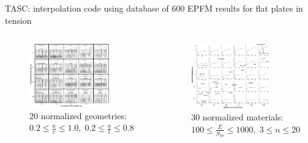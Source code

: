 \begin{frame}
TASC: interpolation code using database of 600 EPFM results for flat plates in tension
\begin{columns}
\begin{column}{0.45\textwidth}
\begin{figure}
\centering
\includegraphics[width=0.8\textwidth]{tasc-geometries}
\caption{20 normalized geometries:\\ \(0.2 \leq \frac{a}{c} \leq 1.0,\; 0.2 \leq \frac{a}{t} \leq 0.8\)}
\end{figure}
\end{column}
\begin{column}{0.45\textwidth}
\begin{figure}
\centering
\includegraphics[width=0.8\textwidth]{tasc-materials}
\caption{30 normalized materials:\\ \(100 \leq \frac{E}{S_{\text{ys}}} \leq 1000,\; 3 \leq n \leq 20\)}
\end{figure}
\end{column}
\end{columns}
\note{
\vfill
}
\end{frame}

